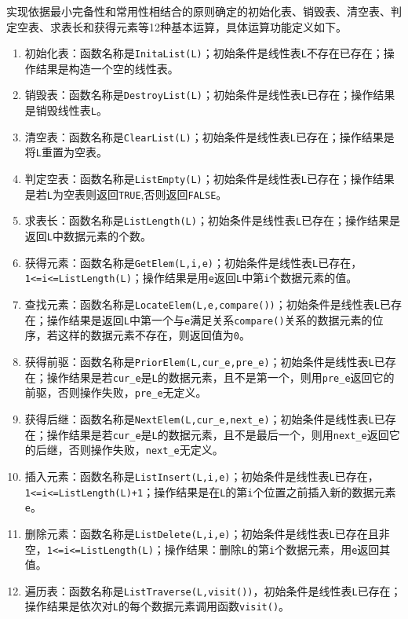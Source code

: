 \documentclass[supercite]{Experimental_Report}
\theoremstyle{definition}
\begin{document}
实现依据最小完备性和常用性相结合的原则确定的初始化表、销毁表、清空表、判定空表、求表长和获得元素等12种基本运算，具体运算功能定义如下。
\begin{enumerate}
	\item 初始化表：函数名称是\verb|InitaList(L)|；初始条件是线性表\verb|L|不存在已存在；操作结果是构造一个空的线性表。
	\item 销毁表：函数名称是\verb|DestroyList(L)|；初始条件是线性表\verb|L|已存在；操作结果是销毁线性表\verb|L|。
	\item 清空表：函数名称是\verb|ClearList(L)|；初始条件是线性表\verb|L|已存在；操作结果是将\verb|L|重置为空表。
	\item 判定空表：函数名称是\verb|ListEmpty(L)|；初始条件是线性表\verb|L|已存在；操作结果是若\verb|L|为空表则返回\verb|TRUE|,否则返回\verb|FALSE|。
	\item 求表长：函数名称是\verb|ListLength(L)|；初始条件是线性表\verb|L|已存在；操作结果是返回\verb|L|中数据元素的个数。
	\item 获得元素：函数名称是\verb|GetElem(L,i,e)|；初始条件是线性表\verb|L|已存在， \\ \verb|1<=i<=ListLength(L)|；操作结果是用\verb|e|返回\verb|L|中第\verb|i|个数据元素的值。
	\item 查找元素：函数名称是\verb|LocateElem(L,e,compare())|；初始条件是线性表\verb|L|已存在；操作结果是返回\verb|L|中第一个与\verb|e|满足关系\verb|compare()|关系的数据元素的位序，若这样的数据元素不存在，则返回值为\verb|0|。
	\item 获得前驱：函数名称是\verb|PriorElem(L,cur_e,pre_e)|；初始条件是线性表\verb|L|已存在；操作结果是若\verb|cur_e|是\verb|L|的数据元素，且不是第一个，则用\verb|pre_e|返回它的前驱，否则操作失败，\verb|pre_e|无定义。
	\item 获得后继：函数名称是\verb|NextElem(L,cur_e,next_e)|；初始条件是线性表\verb|L|已存在；操作结果是若\verb|cur_e|是\verb|L|的数据元素，且不是最后一个，则用\verb|next_e|返回它的后继，否则操作失败，\verb|next_e|无定义。
	\item 插入元素：函数名称是\verb|ListInsert(L,i,e)|；初始条件是线性表\verb|L|已存在，\\ \verb|1<=i<=ListLength(L)+1|；操作结果是在\verb|L|的第\verb|i|个位置之前插入新的数据元素\verb|e|。
	\item 删除元素：函数名称是\verb|ListDelete(L,i,e)|；初始条件是线性表\verb|L|已存在且非空，\verb|1<=i<=ListLength(L)|；操作结果：删除\verb|L|的第\verb|i|个数据元素，用\verb|e|返回其值。
	\item 遍历表：函数名称是\verb|ListTraverse(L,visit())|，初始条件是线性表\verb|L|已存在；操作结果是依次对\verb|L|的每个数据元素调用函数\verb|visit()|。
\end{enumerate}
\end{document}
